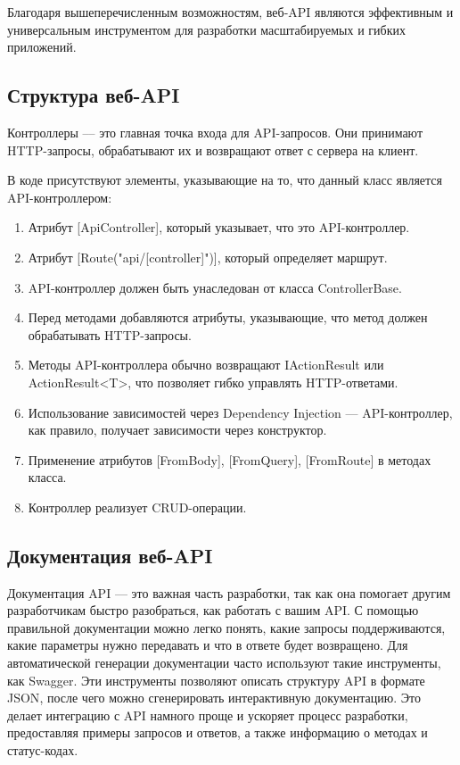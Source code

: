 \documentclass[a4paper,12pt]{report}
\begin{document}
Благодаря вышеперечисленным возможностям, веб-\ac{API} являются эффективным и универсальным инструментом для разработки масштабируемых и гибких приложений.


\subsection{Структура веб-\ac{API}}

Контроллеры –-- это главная точка входа для \ac{API}-запросов. Они принимают \ac{HTTP}-запросы, обрабатывают их и возвращают ответ с сервера на клиент.

В коде присутствуют элементы, указывающие на то, что данный класс является \ac{API}-контроллером:
\begin{enumerate}
  \item
      Атрибут [ApiController], который указывает, что это \ac{API}-контроллер.
  \item
      Атрибут [Route("api/[controller]")], который определяет маршрут.
  \item
      \ac{API}-контроллер должен быть унаследован от класса ControllerBase.
  \item
      Перед методами добавляются атрибуты, указывающие, что метод должен обрабатывать \ac{HTTP}-запросы.
  \item
      Методы \ac{API}-контроллера обычно возвращают IActionResult или ActionResult<T>, что позволяет гибко управлять \ac{HTTP}-ответами.
  \item
      Использование зависимостей через Dependency Injection --- \ac{API}-контроллер, как правило, получает зависимости через конструктор.
  \item
      Применение атрибутов [FromBody], [FromQuery], [FromRoute] в методах класса.
  \item
      Контроллер реализует \ac{CRUD}-операции.
\end{enumerate}

\subsection{Документация веб-\ac{API}}

Документация \ac{API} --- это важная часть разработки, так как она помогает другим разработчикам быстро разобраться, как работать с вашим \ac{API}. 
С помощью правильной документации можно легко понять, какие запросы поддерживаются, какие параметры нужно передавать и что в ответе будет возвращено. 
Для автоматической генерации документации часто используют такие инструменты, как Swagger. Эти инструменты позволяют описать структуру \ac{API} в формате \ac{JSON}, 
после чего можно сгенерировать интерактивную документацию. Это делает интеграцию с API намного проще и ускоряет процесс разработки, предоставляя примеры запросов и ответов, 
а также информацию о методах и статус-кодах.
\end{document}
